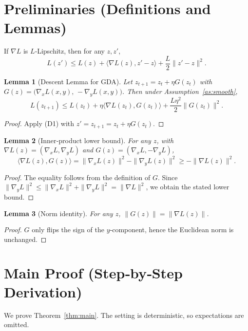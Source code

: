 \documentclass{article}
\newtheorem{lemma}{Lemma}
\begin{document}
\section*{Preliminaries (Definitions and Lemmas)}
\begin{definition}
If $\nabla L$ is $L$‑Lipschitz, then for any $z,z'$,
\[
L(z')\le L(z)+\langle\nabla L(z),z'-z\rangle+\frac{L}{2}\|z'-z\|^{2}. \tag{D1}
\]
\end{definition}
\begin{lemma}[Descent Lemma for GDA]\label{lem:descent}
Let $z_{t+1}=z_t+\eta G(z_t)$ with $G(z)=\big(\nabla_x L(x,y),\,-\nabla_y L(x,y)\big)$.
Then under Assumption~\ref{as:smooth},
\[
L(z_{t+1})\le L(z_t)+\eta\langle\nabla L(z_t),G(z_t)\rangle
+\frac{L\eta^{2}}{2}\|G(z_t)\|^{2}. \tag{D2}
\]
\end{lemma}
\begin{proof}
Apply (D1) with $z'=z_{t+1}=z_t+\eta G(z_t)$.
\end{proof}
\begin{lemma}[Inner‑product lower bound]\label{lem:inner-lower}
For any $z$, with $\nabla L(z)=(\nabla_x L,\nabla_y L)$ and $G(z)=(\nabla_x L,-\nabla_y L)$,
\[
\langle\nabla L(z),G(z)\rangle
= \|\nabla_x L(z)\|^{2}-\|\nabla_y L(z)\|^{2}
\ge -\|\nabla L(z)\|^{2}. \tag{D3}
\]
\end{lemma}
\begin{proof}
The equality follows from the definition of $G$.  Since
$\|\nabla_y L\|^{2}\le\|\nabla_x L\|^{2}+\|\nabla_y L\|^{2}=\|\nabla L\|^{2}$,
we obtain the stated lower bound.
\end{proof}
\begin{lemma}[Norm identity]\label{lem:norm}
For any $z$, $\|G(z)\|=\|\nabla L(z)\|$.
\end{lemma}
\begin{proof}
$G$ only flips the sign of the $y$‑component, hence the Euclidean norm is unchanged.
\end{proof}

\section*{Main Proof (Step‑by‑Step Derivation)}
We prove Theorem~\ref{thm:main}.  The setting is deterministic, so expectations are omitted.
\end{document}
